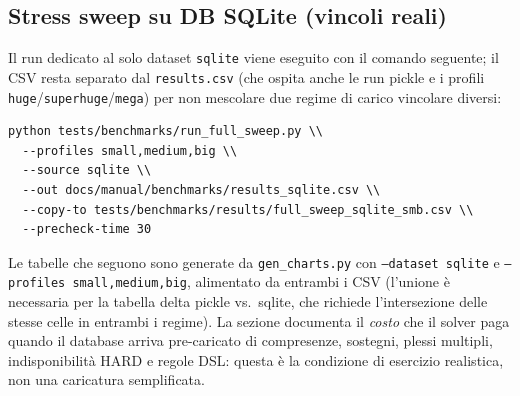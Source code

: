 \subsection{Stress sweep su DB SQLite (vincoli reali)}
\label{sec:bench-v2-sqlite-stress}

Il run dedicato al solo dataset \texttt{sqlite} viene eseguito
con il comando seguente; il CSV resta separato dal
\texttt{results.csv} (che ospita anche le run pickle e i
profili \texttt{huge}/\texttt{superhuge}/\texttt{mega}) per non
mescolare due regime di carico vincolare diversi:

\begin{lstlisting}[style=shell]
python tests/benchmarks/run_full_sweep.py \\
  --profiles small,medium,big \\
  --source sqlite \\
  --out docs/manual/benchmarks/results_sqlite.csv \\
  --copy-to tests/benchmarks/results/full_sweep_sqlite_smb.csv \\
  --precheck-time 30
\end{lstlisting}

Le tabelle che seguono sono generate da
\texttt{gen\_charts.py} con \texttt{--dataset sqlite} e
\texttt{--profiles small,medium,big}, alimentato da entrambi i
CSV (l'unione \`e necessaria per la tabella delta pickle vs.\
sqlite, che richiede l'intersezione delle stesse celle in
entrambi i regime). La sezione documenta il \emph{costo} che il
solver paga quando il database arriva pre-caricato di
compresenze, sostegni, plessi multipli, indisponibilit\`a HARD
e regole DSL: questa \`e la condizione di esercizio realistica,
non una caricatura semplificata.



